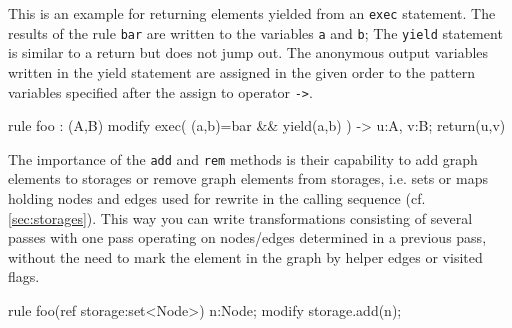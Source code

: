 \begin{example}
This is an example for returning elements yielded from an \texttt{exec} statement.
The results of the rule \texttt{bar} are written to the variables \texttt{a} and \texttt{b};
The \texttt{yield} statement is similar to a return but does not jump out. 
The anonymous output variables written in the yield statement are assigned in the given order to the pattern variables specified after the assign to operator \verb#->#.

	\begin{grgen}
rule foo : (A,B)
{
  modify {
    exec( (a,b)=bar && yield(a,b) ) -> u:A, v:B;
    return(u,v)
  }
}  
	\end{grgen}
\end{example}

\begin{example}
The importance of the \texttt{add} and \texttt{rem} methods is their capability to add graph elements to storages or remove graph elements from storages, i.e. sets or maps holding nodes and edges used for rewrite in the calling sequence (cf. \ref{sec:storages}).
This way you can write transformations consisting of several passes with one pass operating on nodes/edges determined in a previous pass,
without the need to mark the element in the graph by helper edges or visited flags.
	\begin{grgen}
rule foo(ref storage:set<Node>)
{
  n:Node;
  modify {
    storage.add(n);
  }
}  
	\end{grgen}
\end{example}
